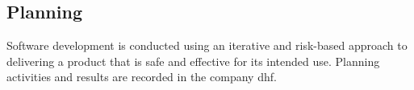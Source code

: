 \subsection{Planning}
Software development is conducted using an iterative and risk-based approach to
delivering a product that is safe and effective for its intended use. Planning
activities and results are recorded in the \gls{company} \Gls{dhf}.
